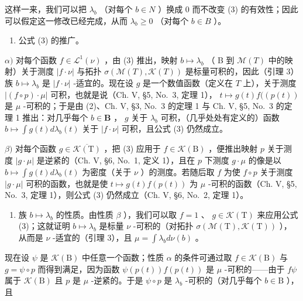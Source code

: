 这样一来，我们可以把 \(\lambda_{b}\) （对每个 \(b \in N\) ）换成 0 而不改变 (3) 的有效性；因此可以假定这一修改已经完成，从而 \(\lambda_{b} \geqslant 0\) （对每个 \(b \in B\) ）。

\begin{enumerate}
\def\labelenumi{\arabic{enumi})}
\setcounter{enumi}{2}
\tightlist
\item
  公式 (3) 的推广。
\end{enumerate}

\(\alpha)\) 对每个函数 \(f \in \mathcal{L}^1(\nu)\) ，由 (3) 推出，映射 \(b \mapsto \lambda_b\) （ B 到 \(\mathcal{M}(T)\) 中的映射）关于测度 \(|f \cdot \nu|\) 与拓扑 \(\sigma(\mathcal{M}(T), \mathcal{K}(T))\) 是标量可积的，因此（引理 3）族 \(b \mapsto \lambda_b\) 是 \(|f \cdot \nu|\) -适宜的。现在设 \(g\) 是一个数值函数（定义在 \(T\) 上），关于测度 \(|(f \circ p) \cdot \mu|\) 可积，也就是说（Ch. V, §5, No.~3, 定理 1）， \(t \mapsto g(t)f((p(t))\) 是 \(\mu\) -可积的；于是由 (2)、Ch. V, §3, No.~3 的定理 1 与 Ch. V, §5, No.~3 的定理 1 推出：对几乎每个 \(b \in \mathbf{B}\) ， \(g\) 关于 \(\lambda_b\) 可积，（几乎处处有定义的）函数 \(b \mapsto \int g(t)d\lambda_b(t)\) 关于 \(|f \cdot \nu|\) 可积，且公式 (3) 仍然成立。

\(\beta)\) 对每个函数 \(g \in \overline{\mathcal{K}(\mathrm{T})}\) ，把 (3) 应用于 \(f \in \mathcal{K}(\mathrm{B})\) ，便推出映射 \(p\) 关于测度 \(|g \cdot \mu|\) 是逆紧的（Ch. V, §6, No.~1, 定义 1），且在 \(p\) 下测度 \(g \cdot \mu\) 的像是以 \(b \mapsto \int g(t) d\lambda_b(t)\) 为密度（关于 \(\nu\) ）的测度。若随后取 \(f\) 为使 \(f \circ p\) 关于测度 \(|g \cdot \mu|\) 可积的函数，也就是使 \(t \mapsto g(t)f(p(t))\) 为 \(\mu\) -可积的函数（Ch. V, §5, No.~3, 定理 1），则公式 (3) 仍然成立（Ch. V, §6, No.~2, 定理 1）。

\begin{enumerate}
\def\labelenumi{\arabic{enumi})}
\setcounter{enumi}{3}
\tightlist
\item
  族 \(b \mapsto \lambda_b\) 的性质。由性质 \(\beta\) ），我们可以取 \(f = 1\) 、 \(g \in \mathcal{K}(\mathrm{T})\) 来应用公式 (3)；这就证明 \(b \mapsto \lambda_b\) 是标量 \(\nu\) -可积的（对拓扑 \(\sigma(\mathcal{M}(\mathrm{T}), \mathcal{K}(\mathrm{T}))\) ），从而是 \(\nu\) -适宜的（引理 3），且 \(\mu = \int \lambda_b d\nu(b)\) 。
\end{enumerate}

现在设 \(\psi\) 是 \(\mathcal{K}(\mathrm{B})\) 中任意一个函数；性质 \(\alpha\) 的条件可通过取 \(f \in \mathcal{K}(\mathrm{B})\) 与 \(g = \psi \circ p\) 而得到满足，因为函数 \(\psi(p(t))f(p(t))\) 是 \(\mu\) -可积的——由于 \(f\psi\) 属于 \(\mathcal{K}(\mathrm{B})\) 且 \(p\) 是 \(\mu\) -逆紧的。于是 \(\psi \circ p\) 是 \(\lambda_b\) -可积的（对几乎每个 \(b \in \mathrm{B}\) ），且

